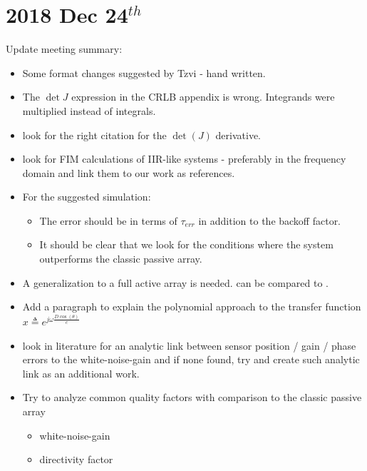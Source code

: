 \documentclass[12pt]{article}
\begin{document}
\section{2018 Dec 24$^{th}$}
Update meeting summary:
\begin{itemize}
    \item Some format changes suggested by Tzvi - hand written.
    \item The $ \det{J} $ expression in the CRLB appendix is wrong. Integrands were multiplied instead of integrals.
    \item look for the right citation for the $\det(J)$ derivative.
    \item look for FIM calculations of IIR-like systems - preferably in the frequency domain and link them to our work as references.
    \item For the suggested simulation:
    \begin{itemize}
        \item The error should be in terms of $\tau_{err}$ in addition to the backoff factor.
        \item It should be clear that we look for the conditions where the system outperforms the classic passive array.
    \end{itemize}
    \item A generalization to a full active array is needed. can be compared to \cite{Chiriac2010ZivSystems}.
    \item Add a paragraph to explain the polynomial approach to the transfer function $ x \triangleq e^{j\omega{\frac{D\cos(\theta)}{c}}} $
    \item look in literature for an analytic link between sensor position / gain / phase errors to the white-noise-gain and if none found, try and create such analytic link as an additional work.
    \item Try to analyze common quality factors with comparison to the classic passive array
    \begin{itemize}
        \item white-noise-gain
        \item directivity factor
    \end{itemize}
\end{itemize}
\end{document}
